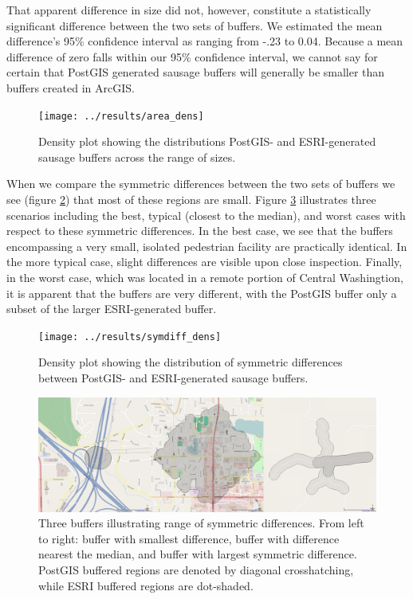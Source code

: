 \documentclass[11pt,letterpaper]{article} %
\begin{document}
That apparent difference in size did not, however, constitute a
statistically significant difference between the two sets of
buffers. We estimated the mean difference's 95\% confidence interval
as ranging from -.23 to 0.04. Because a mean difference of zero falls
within our 95\% confidence interval, we cannot say for certain that
PostGIS generated sausage buffers will generally be smaller than
buffers created in ArcGIS.

\begin{figure}[h!]
  \centering
  \texttt{[image: ../results/area\_dens]}
  \caption{Density plot showing the distributions PostGIS- and
    ESRI-generated sausage buffers across the range of sizes.}
  \label{fig:area_dens}
\end{figure}

When we compare the symmetric differences between the two sets of
buffers we see (figure \ref{fig:symdiff_dens}) that most of these
regions are small. Figure \ref{fig:symmetric_differences} illustrates
three scenarios including the best, typical (closest to the median),
and worst cases with respect to these symmetric differences. In the
best case, we see that the buffers encompassing a very small, isolated
pedestrian facility are practically identical. In the more typical
case, slight differences are visible upon close inspection. Finally,
in the worst case, which was located in a remote portion of Central
Washingtion, it is apparent that the buffers are very different, with
the PostGIS buffer only a subset of the larger ESRI-generated buffer.

\begin{figure}[h!]
  \centering
  \texttt{[image: ../results/symdiff\_dens]}
  \caption{Density plot showing the distribution of symmetric
    differences between PostGIS- and ESRI-generated sausage buffers.}
  \label{fig:symdiff_dens}
\end{figure}

\begin{figure}[h!]
  \centering
  \includegraphics[width=\textwidth]{./figs/symmetric-differences}
  \caption{Three buffers illustrating range of symmetric
    differences. From left to right: buffer with smallest difference,
    buffer with difference nearest the median, and buffer with largest
    symmetric difference. PostGIS buffered regions are denoted by
    diagonal crosshatching, while ESRI buffered regions are
    dot-shaded.}
  \label{fig:symmetric_differences}
\end{figure}
\end{document}

